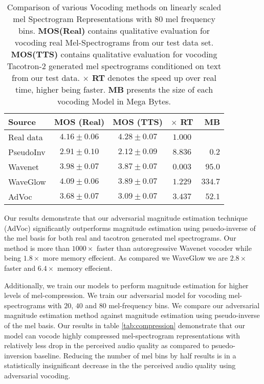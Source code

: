 \documentclass[a4paper]{article}
\begin{document}
\begin{table}[htbp]
\centering
\caption{Comparison of various Vocoding methods on linearly scaled mel Spectrogram Representations with 80 mel frequency bins. \textbf{MOS(Real)} contains qualitative evaluation for vocoding real Mel-Spectrograms from our test data set. \textbf{MOS(TTS)} contains qualitative evaluation for vocoding Tacotron-2 generated mel spectrograms conditioned on text from our test data. \textbf{$\mathbf{\times}$ RT} denotes the speed up over real time, higher being faster. \textbf{MB} presents the size of each vocoding Model in Mega Bytes. 
}
\footnotesize
\begin{tabular}{lcccr}
\toprule
Source & MOS (Real) & MOS (TTS) & $\times$ RT & MB \\
\midrule
Real data & $4.16 \pm 0.06$& $4.28 \pm 0.07$  & $1.000$ &   \\
PseudoInv & $2.91 \pm 0.10$ & $2.12 \pm 0.09$ & $8.836$ & $0.2$ \\
Wavenet \cite{oord2016wavenet} & $3.98 \pm 0.07$ & $3.87 \pm 0.07$ & $0.003$ & $95.0$ \\
WaveGlow \cite{waveglow} & $4.09 \pm 0.06$ & $3.89 \pm 0.07$ & $1.229$ & $334.7$ \\
AdVoc & $3.68 \pm 0.07$ & $3.09 \pm 0.07$ & $3.437$ & $52.1$ \\
\bottomrule
\end{tabular}
\label{tab:realMOS}

\end{table}

Our results demonstrate that our adversarial magnitude estimation technique (AdVoc) significantly outperforms magnitude estimation using psuedo-inverse of the mel basis for both real and tacotron generated mel spectrograms. Our method is more than $1000 \times$ faster than autoregressive Wavenet vocoder while being $1.8 \times$ more memory effecient. As compared we WaveGlow we are $2.8 \times$ faster and $6.4 \times$ memory effecient. 

Additionally, we train our models to perform magnitude estimation for higher levels of mel-compression. We train our adversarial model for vocoding mel-spectrograms with $20$, $40$ and $80$ mel-frequency bins. We compare our adversarial magnitude estimation method against magnitude estimation using pseudo-inverse of the mel basis. Our results in table \ref{tab:compression} demonstrate that our model can vocode highly compressed mel-spectrogram representations with relatively less drop in the perceived audio quality as compared to psuedo-inversion baseline. Reducing the number of mel bins by half results is in a statistically insignificant decrease in the the perceived audio quality using adversarial vocoding.
\end{document}
